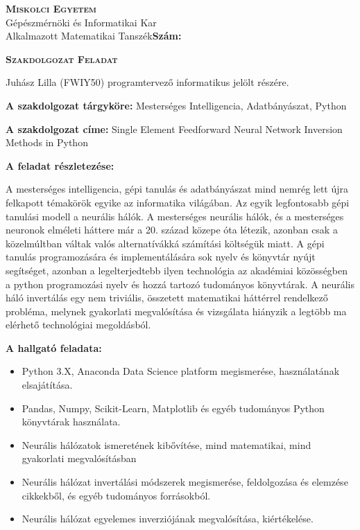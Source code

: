 \begin{flushleft}
	\textsc{\bfseries Miskolci Egyetem}\\
	Gépészmérnöki és Informatikai Kar\\
	Alkalmazott Matematikai Tanszék\hspace*{4cm}\hfil \textbf{Szám:}
\end{flushleft}
\vskip 0.5cm
\begin{center}
	\large\textsc{\bfseries Szakdolgozat Feladat}
\end{center}
\vskip 0.5cm
Juhász Lilla (FWIY50) programtervező informatikus jelölt részére.\newline

\noindent\textbf{A szakdolgozat tárgyköre:} Mesterséges Intelligencia, Adatbányászat, Python\newline

\noindent\textbf{A szakdolgozat címe:} Single Element Feedforward Neural Network Inversion Methods in Python\newline

\noindent\textbf{A feladat részletezése:}

\noindent A mesterséges intelligencia, gépi tanulás és adatbányászat mind nemrég lett újra felkapott témakörök egyike az informatika világában. Az egyik legfontosabb gépi tanulási modell a neurális hálók. A mesterséges neurális hálók, és a mesterséges neuronok elméleti háttere már a 20. század közepe óta létezik, azonban csak a közelmúltban váltak valós alternatívákká számítási költségük miatt. A gépi tanulás programozására és implementálására sok nyelv és könyvtár nyújt segítséget, azonban a legelterjedtebb ilyen technológia az akadémiai közösségben a python programozási nyelv és hozzá tartozó tudományos könyvtárak. A neurális háló invertálás egy nem triviális, összetett matematikai háttérrel rendelkező probléma, melynek gyakorlati megvalósítása és vizsgálata hiányzik a legtöbb ma elérhető technológiai megoldásból.\newline

\noindent\textbf{A hallgató feladata:}
\begin{itemize}
	\setlength\itemsep{0em}
	\item Python 3.X, Anaconda Data Science platform megismerése, használatának elsajátítása.
	\item Pandas, Numpy, Scikit-Learn, Matplotlib és egyéb tudományos Python könyvtárak használata.

	\item Neurális hálózatok ismeretének kibővítése, mind matematikai, mind gyakorlati megvalósításban
	\item Neurális hálózat invertálási módszerek megismerése, feldolgozása és elemzése cikkekből, és egyéb tudományos forrásokból.

	\item Neurális hálózat egyelemes inverziójának megvalósítása, kiértékelése.
\end{itemize}


